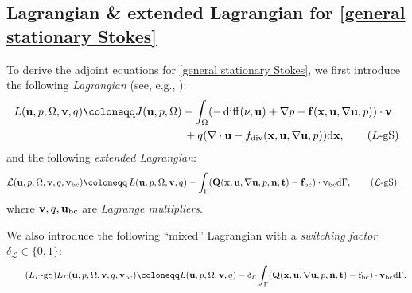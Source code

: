 \documentclass[oneside,11pt]{book}
\numberwithin{equation}{section}
\begin{document}
\subsection{Lagrangian \& extended Lagrangian for \eqref{general stationary Stokes}}
To derive the adjoint equations for \eqref{general stationary Stokes}, we first introduce the following \textit{Lagrangian} (see, e.g., \cite{Troltzsch2010}):
\begin{align}
    L({\bf u},p,\Omega,{\bf v},q)&\coloneqq J({\bf u},p,\Omega) - \int_\Omega (-\operatorname{diff}(\nu,{\bf u}) + \nabla p - {\bf f}({\bf x},{\bf u},\nabla{\bf u},p))\cdot{\bf v}\nonumber\\
    &\hspace{3.2cm}+ q(\nabla\cdot{\bf u} - f_{\rm div}({\bf x},{\bf u},\nabla{\bf u},p)){\rm d}{\bf x},
    \label{Lagrangian for general stationary Stokes}
    \tag{$L$-gS}
\end{align}
and the following \textit{extended Lagrangian}:
\begin{align}
    \mathcal{L}({\bf u},p,\Omega,{\bf v},q,{\bf v}_{\rm bc})\coloneqq&\,L({\bf u},p,\Omega,{\bf v},q) - \int_\Gamma ({\bf Q}({\bf x},{\bf u},\nabla{\bf u},p,{\bf n},{\bf t}) - {\bf f}_{\rm bc})\cdot{\bf v}_{\rm bc}{\rm d}\Gamma,
    \label{extended Lagrangian for general stationary Stokes}
    \tag{$\mathcal{L}$-gS}
\end{align}
where ${\bf v},q,{\bf u}_{\rm bc}$ are \textit{Lagrange multipliers}.

We also introduce the following ``mixed'' Lagrangian with a \textit{switching factor} $\delta_{\mathcal{L}}\in\{0,1\}$:
\begin{align}
    \label{mixed Lagrangian for general stationary Stokes}
    \tag{$L_{\mathcal{L}}$-gS}
    L_{\mathcal{L}}({\bf u},p,\Omega,{\bf v},q,{\bf v}_{\rm bc})\coloneqq L({\bf u},p,\Omega,{\bf v},q) - \delta_{\mathcal{L}}\int_\Gamma ({\bf Q}({\bf x},{\bf u},\nabla{\bf u},p,{\bf n},{\bf t}) - {\bf f}_{\rm bc})\cdot{\bf v}_{\rm bc}{\rm d}\Gamma.
\end{align}
\end{document}
